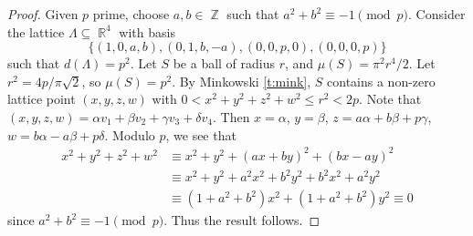 \documentclass[11pt, a4paper]{memoir}
\DeclareMathOperator{\Z}{{\mathbb{Z}}}
\DeclareMathOperator{\R}{{\mathbb{R}}}
\theoremstyle{change}
\theoremstyle{plain}
\theoremstyle{nonumberplain}
\newtheorem{proof}{Proof}
\numberwithin{equation}{section}
\begin{document}
\begin{proof}
    Given $p$ prime, choose $a,b\in\Z$ such that $a^2+b^2\equiv -1\pmod{p}$.
    Consider the lattice $\Lambda\subseteq\R^4$ with basis
    \begin{equation*}
        \{(1,0,a,b),(0,1,b,-a),(0,0,p,0),(0,0,0,p)\}
    \end{equation*}
    such that $d(\Lambda)=p^2$.
    Let $S$ be a ball of radius $r$, and $\mu(S)=\pi^2r^4/2$.
    Let $r^2=4p/\pi\sqrt{2}$, so $\mu(S)=p^2$.
    By Minkowski \cref{t:mink}, $S$ contains a non-zero lattice point $(x,y,z,w)$ with $0<x^2+y^2+z^2+w^2\leq r^2<2p$.
    Note that $(x,y,z,w)=\alpha v_1+\beta v_2+\gamma v_3+\delta v_4$.
    Then $x=\alpha$, $y=\beta$, $z=a\alpha+b\beta+p\gamma$, $w=b\alpha-a\beta+p\delta$.
    Modulo $p$, we see that
    \begin{align*}
        x^2+y^2+z^2+w^2 &\equiv x^2+y^2+(ax+by)^2+(bx-ay)^2\\
                        &\equiv x^2+y^2+a^2x^2+b^2y^2+b^2x^2+a^2y^2\\
                        &\equiv (1+a^2+b^2)x^2+(1+a^2+b^2)y^2\equiv 0
    \end{align*}
    since $a^2+b^2\equiv -1\pmod{p}$.
    Thus the result follows.
\end{proof}
\end{document}
